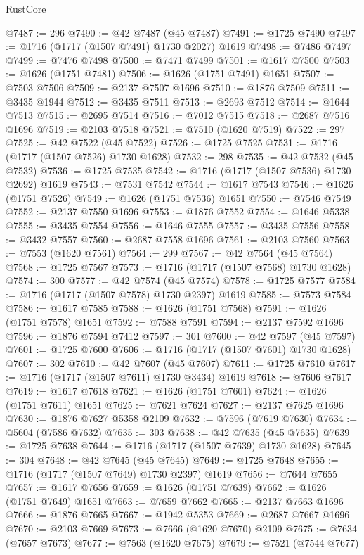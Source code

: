 \begin{lexlean}{RustCore}
\begin{coremodule}
@7487 := 296
@7490 := @42 @7487 (@45 @7487)
@7491 := @1725 @7490
@7497 := @1716 (@1717 (@1507 @7491) @1730 @2027) @1619
@7498 := @7486 @7497
@7499 := @7476 @7498
@7500 := @7471 @7499
@7501 := @1617 @7500
@7503 := @1626 (@1751 @7481)
@7506 := @1626 (@1751 @7491) @1651
@7507 := @7503 @7506
@7509 := @2137 @7507 @1696
@7510 := @1876 @7509
@7511 := @3435 @1944
@7512 := @3435 @7511
@7513 := @2693 @7512
@7514 := @1644 @7513
@7515 := @2695 @7514
@7516 := @7012 @7515
@7518 := @2687 @7516 @1696
@7519 := @2103 @7518
@7521 := @7510 (@1620 @7519)
@7522 := 297
@7525 := @42 @7522 (@45 @7522)
@7526 := @1725 @7525
@7531 := @1716 (@1717 (@1507 @7526) @1730 @1628)
@7532 := 298
@7535 := @42 @7532 (@45 @7532)
@7536 := @1725 @7535
@7542 := @1716 (@1717 (@1507 @7536) @1730 @2692) @1619
@7543 := @7531 @7542
@7544 := @1617 @7543
@7546 := @1626 (@1751 @7526)
@7549 := @1626 (@1751 @7536) @1651
@7550 := @7546 @7549
@7552 := @2137 @7550 @1696
@7553 := @1876 @7552
@7554 := @1646 @5338
@7555 := @3435 @7554
@7556 := @1646 @7555
@7557 := @3435 @7556
@7558 := @3432 @7557
@7560 := @2687 @7558 @1696
@7561 := @2103 @7560
@7563 := @7553 (@1620 @7561)
@7564 := 299
@7567 := @42 @7564 (@45 @7564)
@7568 := @1725 @7567
@7573 := @1716 (@1717 (@1507 @7568) @1730 @1628)
@7574 := 300
@7577 := @42 @7574 (@45 @7574)
@7578 := @1725 @7577
@7584 := @1716 (@1717 (@1507 @7578) @1730 @2397) @1619
@7585 := @7573 @7584
@7586 := @1617 @7585
@7588 := @1626 (@1751 @7568)
@7591 := @1626 (@1751 @7578) @1651
@7592 := @7588 @7591
@7594 := @2137 @7592 @1696
@7596 := @1876 @7594 @7412
@7597 := 301
@7600 := @42 @7597 (@45 @7597)
@7601 := @1725 @7600
@7606 := @1716 (@1717 (@1507 @7601) @1730 @1628)
@7607 := 302
@7610 := @42 @7607 (@45 @7607)
@7611 := @1725 @7610
@7617 := @1716 (@1717 (@1507 @7611) @1730 @3434) @1619
@7618 := @7606 @7617
@7619 := @1617 @7618
@7621 := @1626 (@1751 @7601)
@7624 := @1626 (@1751 @7611) @1651
@7625 := @7621 @7624
@7627 := @2137 @7625 @1696
@7630 := @1876 @7627 @5358 @2109
@7632 := @7596 (@7619 @7630)
@7634 := @5604 (@7586 @7632)
@7635 := 303
@7638 := @42 @7635 (@45 @7635)
@7639 := @1725 @7638
@7644 := @1716 (@1717 (@1507 @7639) @1730 @1628)
@7645 := 304
@7648 := @42 @7645 (@45 @7645)
@7649 := @1725 @7648
@7655 := @1716 (@1717 (@1507 @7649) @1730 @2397) @1619
@7656 := @7644 @7655
@7657 := @1617 @7656
@7659 := @1626 (@1751 @7639)
@7662 := @1626 (@1751 @7649) @1651
@7663 := @7659 @7662
@7665 := @2137 @7663 @1696
@7666 := @1876 @7665
@7667 := @1942 @5353
@7669 := @2687 @7667 @1696
@7670 := @2103 @7669
@7673 := @7666 (@1620 @7670) @2109
@7675 := @7634 (@7657 @7673)
@7677 := @7563 (@1620 @7675)
@7679 := @7521 (@7544 @7677)

\end{coremodule}
\end{lexlean}
